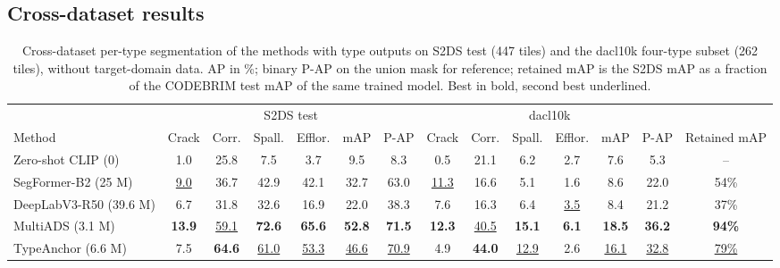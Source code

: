 \documentclass[conference]{IEEEtran}
\newcommand{\best}[1]{\textbf{#1}}
\newcommand{\second}[1]{\underline{#1}}
\newcommand{\ours}{TypeAnchor}
\begin{document}
\subsection{Cross-dataset results}
\begin{table}[t]
\centering
\caption{Cross-dataset per-type segmentation of the methods with type outputs on S2DS test (447 tiles) and the dacl10k four-type subset (262 tiles), without target-domain data. AP in \%; binary P-AP on the union mask for reference; retained mAP is the S2DS mAP as a fraction of the CODEBRIM test mAP of the same trained model. Best in bold, second best underlined.}
\label{tab:cross}
\small
\setlength{\tabcolsep}{4.3pt}
\begin{tabular}{lcccccc|cccccc|c}
\toprule
& \multicolumn{6}{c|}{S2DS test} & \multicolumn{6}{c|}{dacl10k} & \\
Method & Crack & Corr. & Spall. & Efflor. & mAP & P-AP & Crack & Corr. & Spall. & Efflor. & mAP & P-AP & Retained mAP \\
\midrule
Zero-shot CLIP (0) & 1.0 & 25.8 & 7.5 & 3.7 & 9.5 & 8.3 & 0.5 & 21.1 & 6.2 & 2.7 & 7.6 & 5.3 & -- \\
SegFormer-B2 (25 M) & \second{9.0} & 36.7 & 42.9 & 42.1 & 32.7 & 63.0 & \second{11.3} & 16.6 & 5.1 & 1.6 & 8.6 & 22.0 & 54\% \\
DeepLabV3-R50 (39.6 M) & 6.7 & 31.8 & 32.6 & 16.9 & 22.0 & 38.3 & 7.6 & 16.3 & 6.4 & \second{3.5} & 8.4 & 21.2 & 37\% \\
MultiADS (3.1 M) & \best{13.9} & \second{59.1} & \best{72.6} & \best{65.6} & \best{52.8} & \best{71.5} & \best{12.3} & \second{40.5} & \best{15.1} & \best{6.1} & \best{18.5} & \best{36.2} & \best{94\%} \\
\ours{} (6.6 M) & 7.5 & \best{64.6} & \second{61.0} & \second{53.3} & \second{46.6} & \second{70.9} & 4.9 & \best{44.0} & \second{12.9} & 2.6 & \second{16.1} & \second{32.8} & \second{79\%} \\
\bottomrule
\end{tabular}
\end{table}
\end{document}
